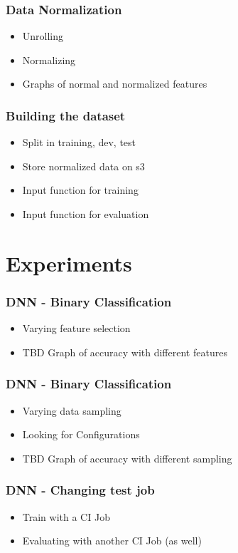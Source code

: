 \documentclass[aspectratio=169,11pt,hyperref={colorlinks=true}]{beamer}
\begin{document}
\begin{frame}
    \frametitle{Data Normalization}
    \begin{itemize}
        \item{Unrolling}
        \item{Normalizing}
        \item{Graphs of normal and normalized features}
    \end{itemize}
\end{frame}

\begin{frame}
    \frametitle{Building the dataset}
    \begin{itemize}
        \item{Split in training, dev, test}
        \item{Store normalized data on s3}
        \item{Input function for training}
        \item{Input function for evaluation}
    \end{itemize}
\end{frame}

\section{Experiments}
\begin{frame}
    \frametitle{DNN - Binary Classification}
    \begin{itemize}
        \item{Varying feature selection}
        \item{TBD Graph of accuracy with different features}
    \end{itemize}
\end{frame}

\begin{frame}
    \frametitle{DNN - Binary Classification}
    \begin{itemize}
        \item{Varying data sampling}
        \item{Looking for Configurations}
        \item{TBD Graph of accuracy with different sampling}
    \end{itemize}
\end{frame}

\begin{frame}
    \frametitle{DNN - Changing test job}
    \begin{itemize}
        \item{Train with a CI Job}
        \item{Evaluating with another CI Job (as well)}
    \end{itemize}
\end{frame}
\end{document}

